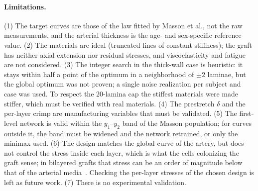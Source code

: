 \paragraph{Limitations.} (1) The target curves are those of the law fitted by Masson et al., not the raw measurements, and the arterial thickness is the age- and sex-specific reference value. (2) The materials are ideal (truncated lines of constant stiffness); the graft has neither axial extension nor residual stresses, and viscoelasticity and fatigue are not considered. (3) The integer search in the thick-wall case is heuristic: it stays within half a point of the optimum in a neighborhood of $\pm2$ laminae, but the global optimum was not proven; a single noise realization per subject and case was used. To respect the 20-lamina cap the stiffest materials were made stiffer, which must be verified with real materials. (4) The prestretch $\delta$ and the per-layer crimp are manufacturing variables that must be validated. (5) The first-level network is valid within the $y_1$--$y_2$ band of the Masson population; for curves outside it, the band must be widened and the network retrained, or only the minimax used. (6) The design matches the global curve of the artery, but does not control the stress inside each layer, which is what the cells colonizing the graft sense; in bilayered grafts that stress can be an order of magnitude below that of the arterial media~\cite{szafron17}. Checking the per-layer stresses of the chosen design is left as future work. (7) There is no experimental validation.

